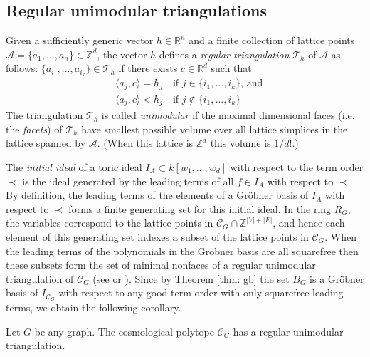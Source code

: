 \subsection{Regular unimodular triangulations}
\label{subsec: reg tri}
Given a sufficiently generic vector $h\in \mathbb{R}^n$ and a finite collection of lattice points $\mathcal{A}=\{a_1,\ldots,a_n\}\in \mathbb{Z}^d$, the vector $h$ defines a \emph{regular triangulation} $\mathcal{T}_h$ of $\mathcal{A}$ as follows: $\{a_{i_1},\ldots, a_{i_k}\}\in \mathcal{T}_h$ if there exists $c\in\mathbb{R}^d$ such that
\[
\begin{split}
    &\langle a_j, c\rangle = h_j \quad \mbox{if $j\in\{i_1,\ldots,i_k\}$, and}\\
    &\langle a_j, c\rangle < h_j \quad \mbox{if $j\notin\{i_1,\ldots,i_k\}$}
\end{split}
\]
The triangulation $\mathcal{T}_h$ is called \emph{unimodular} if the maximal dimensional faces (i.e. the \emph{facets}) of $\mathcal{T}_h$ have smallest possible volume over all lattice simplices in the lattice spanned by $\mathcal{A}$. (When this lattice is $\mathbb{Z}^d$ this volume is $1/d!$.)

The \emph{initial ideal} of a toric ideal $I_A\subset k[w_1,\ldots,w_d]$ with respect to the term order $\prec$ is the ideal generated by the leading terms of all $f\in I_A$ with respect to $\prec$. 
By definition, the leading terms of the elements of a Gr\"obner basis of $I_A$ with respect to $\prec$ forms a finite generating set for this initial ideal. 
In the ring $R_G$, the variables correspond to the lattice points in $\mathcal{C}_G \cap \mathbb{Z}^{|V|+|E|}$, and hence each element of this generating set indexes a subset of the lattice points in $\mathcal{C}_G$. 
When the leading terms of the polynomials in the Gr\"obner basis are all squarefree then these subsets form the set of minimal nonfaces of a regular unimodular triangulation of $\mathcal{C}_G$ (see \cite[Theorem 8.3]{sturmfels1996grobner} or \cite[Section 9.4]{DRS}). 
Since by Theorem \ref{thm: gb} the set $B_G$ is a Gr\"{o}bner basis of $I_{\mathcal{C}_G}$  with respect to any good term order with only squarefree leading terms, we obtain the following corollary.


\begin{coro}
\label{cor: triangulation}
    Let $G$ be any graph. The cosmological polytope $\mathcal{C}_G$ has a regular unimodular triangulation.
\end{coro}

